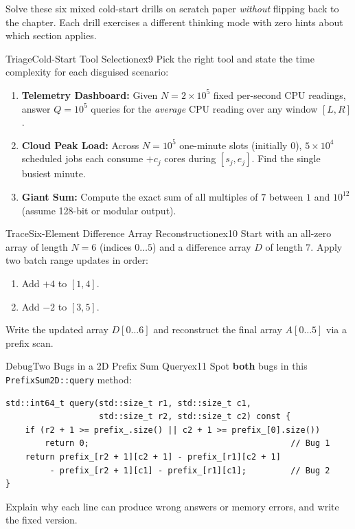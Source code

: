 \documentclass[11pt,a4paper]{article}
\theoremstyle{definition}
\newcounter{exercise}
\begin{document}
\noindent
Solve these six mixed cold-start drills on scratch paper \emph{without} flipping back to the chapter. Each drill exercises a different thinking mode with zero hints about which section applies.

\begin{tryitbox}{Triage}{Cold-Start Tool Selection}{ex9}
Pick the right tool and state the time complexity for each disguised scenario:
\begin{enumerate}
    \item \textbf{Telemetry Dashboard:} Given $N = 2 \times 10^5$ fixed per-second CPU readings, answer $Q = 10^5$ queries for the \emph{average} CPU reading over any window $[L, R]$.
    \item \textbf{Cloud Peak Load:} Across $N = 10^5$ one-minute slots (initially $0$), $5 \times 10^4$ scheduled jobs each consume $+c_j$ cores during $[s_j, e_j]$. Find the single busiest minute.
    \item \textbf{Giant Sum:} Compute the exact sum of all multiples of $7$ between $1$ and $10^{12}$ (assume 128-bit or modular output).
\end{enumerate}
\end{tryitbox}

\begin{tryitbox}{Trace}{Six-Element Difference Array Reconstruction}{ex10}
Start with an all-zero array of length $N = 6$ (indices $0 \dots 5$) and a difference array $D$ of length $7$. Apply two batch range updates in order:
\begin{enumerate}
    \item Add $+4$ to $[1, 4]$.
    \item Add $-2$ to $[3, 5]$.
\end{enumerate}
Write the updated array $D[0 \dots 6]$ and reconstruct the final array $A[0 \dots 5]$ via a prefix scan.
\end{tryitbox}

\begin{tryitbox}{Debug}{Two Bugs in a 2D Prefix Sum Query}{ex11}
Spot \textbf{both} bugs in this \texttt{PrefixSum2D::query} method:
\begin{lstlisting}[numbers=none, xleftmargin=4pt, framexleftmargin=4pt]
std::int64_t query(std::size_t r1, std::size_t c1,
                   std::size_t r2, std::size_t c2) const {
    if (r2 + 1 >= prefix_.size() || c2 + 1 >= prefix_[0].size())
        return 0;                                         // Bug 1
    return prefix_[r2 + 1][c2 + 1] - prefix_[r1][c2 + 1]
         - prefix_[r2 + 1][c1] - prefix_[r1][c1];         // Bug 2
}
\end{lstlisting}
Explain why each line can produce wrong answers or memory errors, and write the fixed version.
\end{tryitbox}
\end{document}
